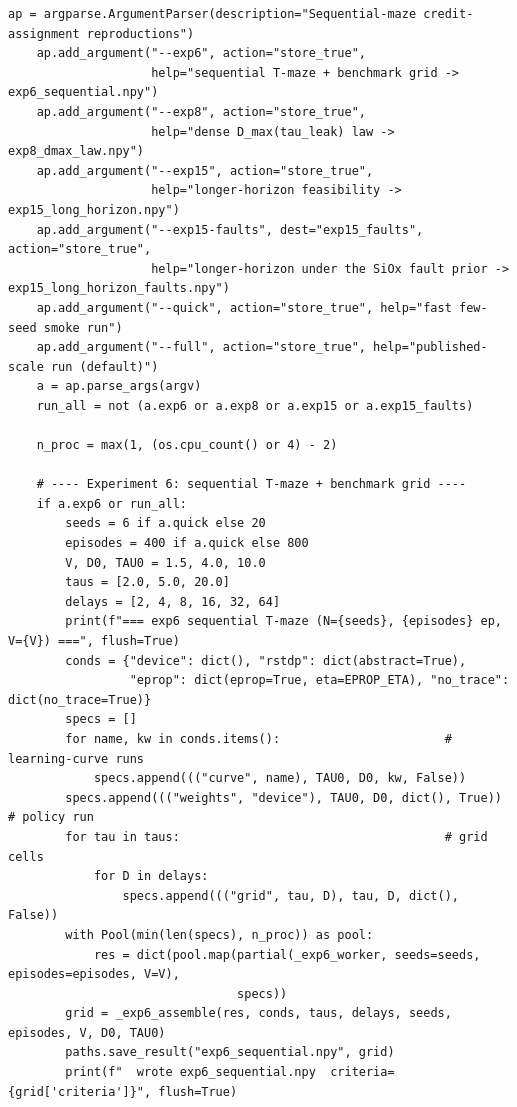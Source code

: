 \begin{lstlisting}[caption={mrl\_trace/maze.py},label={lst:siox-src-maze}]
    ap = argparse.ArgumentParser(description="Sequential-maze credit-assignment reproductions")
    ap.add_argument("--exp6", action="store_true",
                    help="sequential T-maze + benchmark grid -> exp6_sequential.npy")
    ap.add_argument("--exp8", action="store_true",
                    help="dense D_max(tau_leak) law -> exp8_dmax_law.npy")
    ap.add_argument("--exp15", action="store_true",
                    help="longer-horizon feasibility -> exp15_long_horizon.npy")
    ap.add_argument("--exp15-faults", dest="exp15_faults", action="store_true",
                    help="longer-horizon under the SiOx fault prior -> exp15_long_horizon_faults.npy")
    ap.add_argument("--quick", action="store_true", help="fast few-seed smoke run")
    ap.add_argument("--full", action="store_true", help="published-scale run (default)")
    a = ap.parse_args(argv)
    run_all = not (a.exp6 or a.exp8 or a.exp15 or a.exp15_faults)

    n_proc = max(1, (os.cpu_count() or 4) - 2)

    # ---- Experiment 6: sequential T-maze + benchmark grid ----
    if a.exp6 or run_all:
        seeds = 6 if a.quick else 20
        episodes = 400 if a.quick else 800
        V, D0, TAU0 = 1.5, 4.0, 10.0
        taus = [2.0, 5.0, 20.0]
        delays = [2, 4, 8, 16, 32, 64]
        print(f"=== exp6 sequential T-maze (N={seeds}, {episodes} ep, V={V}) ===", flush=True)
        conds = {"device": dict(), "rstdp": dict(abstract=True),
                 "eprop": dict(eprop=True, eta=EPROP_ETA), "no_trace": dict(no_trace=True)}
        specs = []
        for name, kw in conds.items():                       # learning-curve runs
            specs.append((("curve", name), TAU0, D0, kw, False))
        specs.append((("weights", "device"), TAU0, D0, dict(), True))   # policy run
        for tau in taus:                                     # grid cells
            for D in delays:
                specs.append((("grid", tau, D), tau, D, dict(), False))
        with Pool(min(len(specs), n_proc)) as pool:
            res = dict(pool.map(partial(_exp6_worker, seeds=seeds, episodes=episodes, V=V),
                                specs))
        grid = _exp6_assemble(res, conds, taus, delays, seeds, episodes, V, D0, TAU0)
        paths.save_result("exp6_sequential.npy", grid)
        print(f"  wrote exp6_sequential.npy  criteria={grid['criteria']}", flush=True)


\end{lstlisting}
